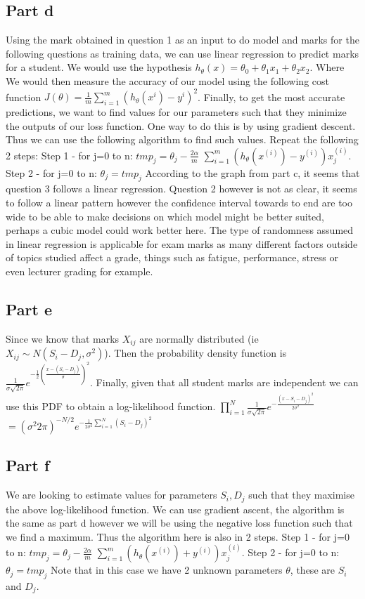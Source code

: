 \documentclass[10pt]{article}
\begin{document}
\subsection*{Part d}
Using the mark obtained in question 1 as an input to do model and marks for the following questions
as training data, we can use linear regression to predict marks for a student.
We would use the hypothesis $ h_{\theta}(x) = \theta_{0} + \theta_{1}x_{1} + \theta_{2}x_{2} $. Where
We would then measure the accuracy of our model using the following cost function 
$ J(\theta) = \frac{1}{m}\sum_{i = 1}^m (h_{\theta}(x^{i}) - y^{i})^2$. Finally, to get the most accurate
predictions, we want to find values for our parameters such that they minimize the outputs of our loss
function. One way to do this is by using gradient descent. Thus we can use the following algorithm to find such
values. Repeat the following 2 steps: Step 1 - for j=0 to n: $ tmp_{j} = \theta_{j} - \frac{2\alpha}{m}$
$\sum_{i = 1}^m (h_{\theta}(x^{(i)}) - y^{(i)})x_{j}^{(i)}$. Step 2 - for j=0 to n: $ \theta_{j} = tmp_{j} $
According to the graph from part c, it seems that question 3 follows a linear regression. Question 2 however
is not as clear, it seems to follow a linear pattern however the confidence interval towards to end are too wide 
to be able to make decisions on which model might be better suited, perhaps a cubic model could work better here.
The type of randomness assumed in linear regression is applicable for exam marks as many different factors
outside of topics studied affect a grade, things such as fatigue, performance, stress or even lecturer grading for example.

\subsection*{Part e}
Since we know that marks $ X_{ij} $ are normally distributed (ie 
$X_{ij}\sim N(S_{i} - D_{j}, \sigma^2)$). Then the probability density function is 
$ \frac{1}{\sigma\sqrt{2\pi}}e^{-\frac{1}{2}(\frac{x - (S_{i} - D_{j})}{\sigma})^2} $.
Finally, given that all student marks are independent we can use this PDF to obtain a 
log-likelihood function. $ \prod_{i = 1}^N\frac{1}{\sigma\sqrt{2\pi}} e^{-\frac{(x - S_{i} - D_{j})^2}{2\sigma^2}} $
$ = (\sigma^{2}2\pi)^{-N/2}e^{-\frac{1}{2\sigma^2}\sum_{i = 1}^N(S_{i} - D_{j})^2} $

\subsection*{Part f}
We are looking to estimate values for parameters $S_{i}, D_{j}$ such that they maximise the above log-likelihood
function. We can use gradient ascent, the algorithm is the same as part d however we will be using
the negative loss function such that we find a maximum. Thus the algorithm here is also in 2 steps.
Step 1 - for j=0 to n: $ tmp_{j} = \theta_{j} - \frac{2\alpha}{m}$
$\sum_{i = 1}^m (h_{\theta}(x^{(i)}) + y^{(i)})x_{j}^{(i)}$. 
Step 2 - for j=0 to n: $ \theta_{j} = tmp_{j} $ 
Note that in this case we have 2 unknown parameters $ \theta $, these are $ S_{i} $ and $ D_{j} $.
\end{document}
